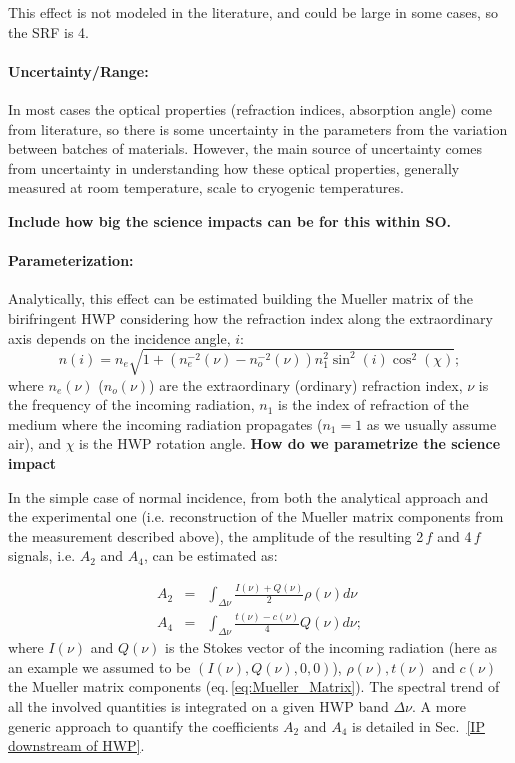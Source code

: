 This effect is not modeled in the literature, and could be large in some cases, so the SRF is 4.

\paragraph{Uncertainty/Range:}
In most cases the optical properties (refraction indices, absorption angle) come from literature, so there is some uncertainty in the parameters from the variation between batches of materials. However, the main source of uncertainty comes from uncertainty in understanding how these optical properties, generally measured at room temperature, scale to cryogenic temperatures.

\textbf{Include how big the science impacts can be for this within SO.}

\paragraph{Parameterization:}
Analytically, this effect can be estimated building the Mueller matrix of the birifringent HWP considering how the refraction index along the extraordinary axis depends on the incidence angle, $i$:
\begin{equation}
n(i)=n_e\sqrt{1+(n_e^{-2}(\nu)-n_o^{-2}(\nu))n_1^2\sin^2(i)\cos^2(\chi)};
\end{equation}
where $n_e(\nu)$ ($n_o(\nu)$) are the extraordinary (ordinary) refraction index, $\nu$ is the frequency of the incoming radiation, $n_1$ is the index of refraction of the medium where the incoming radiation propagates ($n_1=1$ as we usually assume air), and $\chi$ is the HWP rotation angle. \textbf{How do we parametrize the science impact}

In the simple case of normal incidence, from both the analytical approach and the experimental one (i.e. reconstruction of the Mueller matrix components from the measurement described above), the amplitude of the resulting 2$\,f$ and 4$\,f$ signals, i.e. $A_2$ and $A_4$, can be estimated as:

\begin{eqnarray}
  A_2 &=& \int_{\Delta\nu} \frac{I(\nu)+Q(\nu)}{2} \rho(\nu) d\nu\\ \label{A2}
  A_4 &=& \int_{\Delta\nu} \frac{t(\nu)-c(\nu)}{4} Q(\nu) d\nu; \label{A4}
\end{eqnarray}
where $I(\nu)$ and $Q(\nu)$ is the Stokes vector of the incoming radiation (here as an example we assumed to be $(I(\nu), Q(\nu),0,0)$),
$\rho(\nu), t(\nu)$ and $c(\nu)$ the Mueller matrix components (eq.\,\ref{eq:Mueller_Matrix}). The spectral trend of all the involved quantities is integrated on a given HWP band $\Delta\nu$. A more generic approach to quantify the coefficients $A_2$ and $A_4$ is detailed in Sec.~\ref{IP downstream of HWP}.



